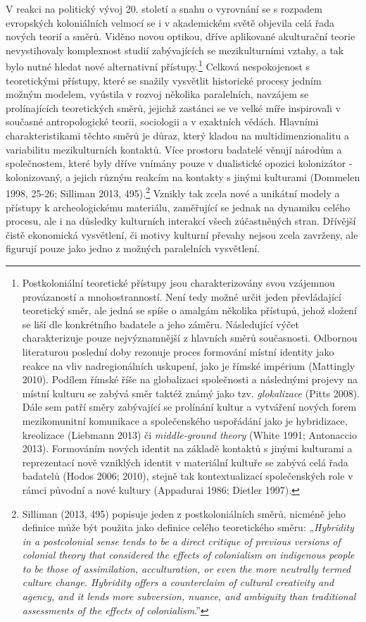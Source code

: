V reakci na politický vývoj 20. století a snahu o vyrovnání se s rozpadem evropských koloniálních velmocí se i v akademickém světě objevila celá řada nových teorií a směrů. Viděno novou optikou, dříve aplikované akulturační teorie nevystihovaly komplexnost studií zabývajících se mezikulturními vztahy, a tak bylo nutné hledat nové alternativní přístupy.\footnote{Postkoloniální teoretické přístupy jsou charakterizovány svou vzájemnou provázaností a mnohostranností. Není tedy možné určit jeden převládající teoretický směr, ale jedná se spíše o amalgám několika přístupů, jehož složení se liší dle konkrétního badatele a jeho záměru. Následující výčet charakterizuje pouze nejvýznamnější z hlavních směrů současnosti. Odbornou literaturou poslední doby rezonuje proces formování místní identity jako reakce na vliv nadregionálních uskupení, jako je římské impérium (Mattingly 2010). Podílem římské říše na globalizaci společnosti a následnými projevy na místní kulturu se zabývá směr taktéž známý jako tzv. {\em glokalizace} (Pitts 2008). Dále sem patří směry zabývající se prolínání kultur a vytváření nových forem mezikomunitní komunikace a společenského uspořádání jako je hybridizace, kreolizace (Liebmann 2013) či {\em middle-ground theory} (White 1991; Antonaccio 2013). Formováním nových identit na základě kontaktů s jinými kulturami a reprezentací nově vzniklých identit v materiální kultuře se zabývá celá řada badatelů (Hodos 2006; 2010), stejně tak kontextualizací společenských role v rámci původní a nové kultury (Appadurai 1986; Dietler 1997).} Celková nespokojenost s teoretickými přístupy, které se snažily vysvětlit historické procesy jedním možným modelem, vyústila v rozvoj několika paralelních, navzájem se prolínajících teoretických směrů, jejichž zastánci se ve velké míře inspirovali v současné antropologické teorii, sociologii a v exaktních vědách. Hlavními charakteristikami těchto směrů je důraz, který kladou na multidimenzionalitu a variabilitu mezikulturních kontaktů. Více prostoru badatelé věnují národům a společnostem, které byly dříve vnímány pouze v dualistické opozici kolonizátor - kolonizovaný, a jejich různým reakcím na kontakty s jinými kulturami (Dommelen 1998, 25-26; Silliman 2013, 495).\footnote{Silliman (2013, 495) popisuje jeden z postkoloniálních směrů, nicméně jeho definice může být použita jako definice celého teoretického směru: „{\em Hybridity in a postcolonial sense tends to be a direct critique of previous versions of colonial theory that considered the effects of colonialism on indigenous people to be those of assimilation, acculturation, or even the more neutrally termed culture change. Hybridity offers a counterclaim of cultural creativity and agency, and it lends more subversion, nuance, and ambiguity than traditional assessments of the effects of colonialism}.”} Vznikly tak zcela nové a unikátní modely a přístupy k archeologickému materiálu, zaměřující se jednak na dynamiku celého procesu, ale i na důsledky kulturních interakcí všech zúčastněných stran. Dřívější čistě ekonomická vysvětlení, či motivy kulturní převahy nejsou zcela zavrženy, ale figurují pouze jako jedno z možných paralelních vysvětlení.

